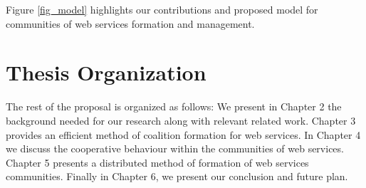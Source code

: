 %
%

Figure \ref{fig_model} highlights our contributions and proposed model for communities of web services formation and management.

\section{Thesis Organization}\label{sec:outline}
The rest of the proposal is organized as follows: We present in Chapter 2 the background needed for our research along with relevant related work. Chapter 3 provides an efficient method of coalition formation for web services. In Chapter 4 we discuss the cooperative behaviour within the communities of web services. Chapter 5 presents a distributed method of formation of web services communities. Finally in Chapter 6, we present our conclusion and future plan.



